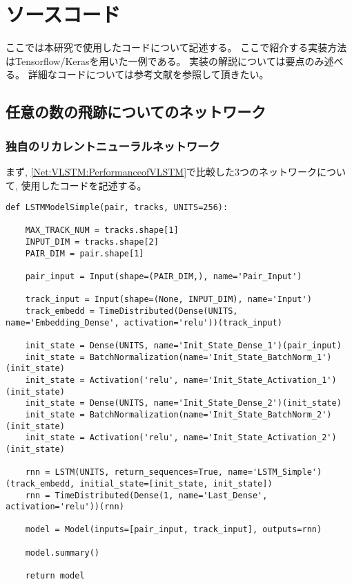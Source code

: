 
\appendix 

\chapter{ソースコード} \label{sec:Code}

ここでは本研究で使用したコードについて記述する。
ここで紹介する実装方法はTensorflow/Kerasを用いた一例である。
実装の解説については要点のみ述べる。
詳細なコードについては参考文献\cite{GitHubGotoK}を参照して頂きたい。

\section{任意の数の飛跡についてのネットワーク} \label{sec:CodeVLSTM}
\subsection{独自のリカレントニューラルネットワーク} \label{sec:CodeVLSTM:Cell}

まず, \ref{Net:VLSTM:PerformanceofVLSTM}で比較した3つのネットワークについて, 使用したコードを記述する。

\begin{lstlisting}[caption=標準的なLSTM, label=SimpleLSTM]
def LSTMModelSimple(pair, tracks, UNITS=256):

    MAX_TRACK_NUM = tracks.shape[1]
    INPUT_DIM = tracks.shape[2]
    PAIR_DIM = pair.shape[1]

    pair_input = Input(shape=(PAIR_DIM,), name='Pair_Input')

    track_input = Input(shape=(None, INPUT_DIM), name='Input')
    track_embedd = TimeDistributed(Dense(UNITS, name='Embedding_Dense', activation='relu'))(track_input)

    init_state = Dense(UNITS, name='Init_State_Dense_1')(pair_input)
    init_state = BatchNormalization(name='Init_State_BatchNorm_1')(init_state)
    init_state = Activation('relu', name='Init_State_Activation_1')(init_state)
    init_state = Dense(UNITS, name='Init_State_Dense_2')(init_state)
    init_state = BatchNormalization(name='Init_State_BatchNorm_2')(init_state)
    init_state = Activation('relu', name='Init_State_Activation_2')(init_state)

    rnn = LSTM(UNITS, return_sequences=True, name='LSTM_Simple')(track_embedd, initial_state=[init_state, init_state])
    rnn = TimeDistributed(Dense(1, name='Last_Dense', activation='relu'))(rnn)
    
    model = Model(inputs=[pair_input, track_input], outputs=rnn)

    model.summary()

    return model
\end{lstlisting}

